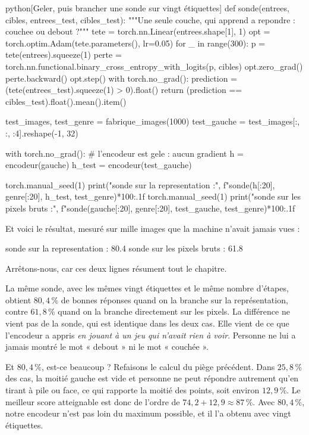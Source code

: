 \begin{code}{python}[Geler, puis brancher une sonde sur vingt étiquettes]
def sonde(entrees, cibles, entrees_test, cibles_test):
    """Une seule couche, qui apprend a repondre : couchee ou debout ?"""
    tete = torch.nn.Linear(entrees.shape[1], 1)
    opt = torch.optim.Adam(tete.parameters(), lr=0.05)
    for _ in range(300):
        p = tete(entrees).squeeze(1)
        perte = torch.nn.functional.binary_cross_entropy_with_logits(p, cibles)
        opt.zero_grad()
        perte.backward()
        opt.step()
    with torch.no_grad():
        prediction = (tete(entrees_test).squeeze(1) > 0).float()
        return (prediction == cibles_test).float().mean().item()

test_images, test_genre = fabrique_images(1000)
test_gauche = test_images[:, :, :4].reshape(-1, 32)

with torch.no_grad():                  # l'encodeur est gele : aucun gradient
    h = encodeur(gauche)
    h_test = encodeur(test_gauche)

torch.manual_seed(1)
print("sonde sur la representation :",
      f"{sonde(h[:20], genre[:20], h_test, test_genre)*100:.1f} %
torch.manual_seed(1)
print("sonde sur les pixels bruts  :",
      f"{sonde(gauche[:20], genre[:20], test_gauche, test_genre)*100:.1f} %
\end{code}

Et voici le résultat, mesuré sur mille images que la machine n'avait jamais
vues :

\begin{sortie}[Le verdict]
sonde sur la representation : 80.4 %
sonde sur les pixels bruts  : 61.8 %
\end{sortie}

Arrêtons-nous, car ces deux lignes résument tout le chapitre.

La même sonde, avec les mêmes vingt étiquettes et le même nombre d'étapes,
obtient $80{,}4\,\%$ de bonnes réponses quand on la branche sur la
représentation, contre $61{,}8\,\%$ quand on la branche directement sur les
pixels. La différence ne vient pas de la sonde, qui est identique dans les
deux cas. Elle vient de ce que l'encodeur a appris \emph{en jouant à un jeu
qui n'avait rien à voir}. Personne ne lui a jamais montré le mot « debout »
ni le mot « couchée ».

\begin{remarque}
Et $80{,}4\,\%$, est-ce beaucoup ? Refaisons le calcul du piège précédent. Dans
$25{,}8\,\%$ des cas, la moitié gauche est vide et personne ne peut répondre
autrement qu'en tirant à pile ou face, ce qui rapporte la moitié des points,
soit environ $12{,}9\,\%$. Le meilleur score atteignable est donc de l'ordre de
$74{,}2 + 12{,}9 \approx 87\,\%$. Avec $80{,}4\,\%$, notre encodeur n'est pas
loin du maximum possible, et il l'a obtenu avec vingt étiquettes.
\end{remarque}

